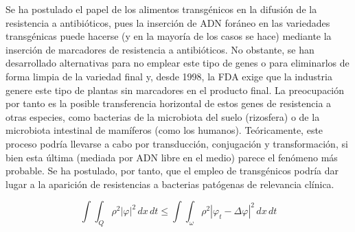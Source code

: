 \documentclass[11pt,a4paper]{article}
\begin{document}
Se ha postulado el papel de los alimentos transgénicos en la difusión de la resistencia a antibióticos, pues la inserción de ADN foráneo en las variedades transgénicas puede hacerse (y en la mayoría de los casos se hace) mediante la inserción de marcadores de resistencia a antibióticos.
No obstante, se han desarrollado alternativas para no emplear este tipo de genes o para eliminarlos de forma limpia de la variedad final 
y, desde 1998, la FDA exige que la industria genere este tipo de plantas sin marcadores en el producto final. \cite{okamoto}
La preocupación por tanto es la posible transferencia horizontal de estos genes de resistencia a otras especies, como bacterias de la microbiota del suelo (rizosfera) o de la microbiota intestinal de mamíferos (como los humanos). Teóricamente, este proceso podría llevarse a cabo por transducción, conjugación y transformación, si bien esta última (mediada por ADN libre en el medio) parece el fenómeno más probable. Se ha postulado, por tanto, que el empleo de transgénicos podría dar lugar a la aparición de resistencias a bacterias patógenas de relevancia clínica. 



\begin{equation}\label{eq4}
\int\!\!\!\int_Q\rho^2|\varphi|^2\,dx\,dt
\le
\int\!\!\!\int_\omega\rho^2|\varphi_t-\Delta\varphi|^2\,dx\,dt
\end{equation}
\end{document}
